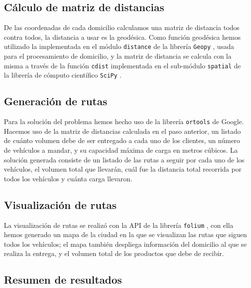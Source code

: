 \documentclass[journal]{IEEEtran}
\begin{document}
        \subsection{Cálculo de matriz de distancias} \label{stage 3}
            
            De las coordenadas de cada domicilio calculamos una matriz de distancia todos contra todos, la distancia a usar es la geodésica. Como función geodésica hemos utilizado la implementada en el módulo \texttt{distance} de la librería \texttt{Geopy} \cite{geopy}, usada para el procesamiento de domicilio, y la matriz de distancia se calcula con la misma a través de la función \texttt{cdist} implementada en el sub-módulo \texttt{spatial} de la librería de cómputo científico \texttt{SciPy} \cite{2020SciPy-NMeth}.

        \subsection{Generación de rutas} \label{stage 4}
        
            Para la solución del problema hemos hecho uso de la librería \texttt{ortools} \cite{ortools} de Google. Hacemos uso de la matriz de distancias calculada en el paso anterior, un listado de cuánto volumen debe de ser entregado a cada uno de los clientes, un número de vehículos a mandar, y su capacidad máxima de carga en metros cúbicos. La solución generada consiste de un listado de las rutas a seguir por cada uno de los vehículos, el volumen total que llevarán, cuál fue la distancia total recorrida por todos los vehículos y cuánta carga llevaron.

        \subsection{Visualización de rutas} 
            
            La visualización de rutas se realizó con la API de la librería \texttt{folium} \cite{folium}, con ella hemos generado un mapa de la ciudad en la que se visualizan las rutas que siguen todos los vehículos; el mapa también despliega información del domicilio al que se realiza la entrega, y el volumen total de los productos que debe de recibir.
        
        \subsection{Resumen de resultados}
\end{document}
